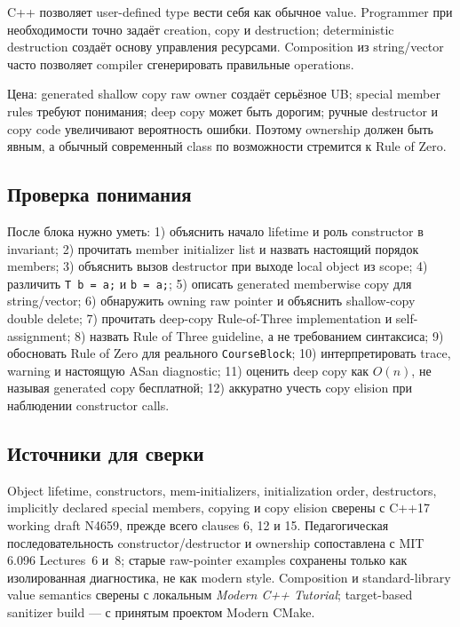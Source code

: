C++ позволяет user-defined type вести себя как обычное value. Programmer при
необходимости точно задаёт creation, copy и destruction; deterministic
destruction создаёт основу управления ресурсами. Composition из string/vector
часто позволяет compiler сгенерировать правильные operations.

Цена: generated shallow copy raw owner создаёт серьёзное UB; special member
rules требуют понимания; deep copy может быть дорогим; ручные destructor и
copy code увеличивают вероятность ошибки. Поэтому ownership должен быть
явным, а обычный современный class по возможности стремится к Rule of Zero.

\subsection{Проверка понимания}

После блока нужно уметь:
1) объяснить начало lifetime и роль constructor в invariant; 2) прочитать member initializer list и назвать настоящий порядок members; 3) объяснить вызов destructor при выходе local object из scope; 4) различить \texttt{T b = a;} и \texttt{b = a;}; 5) описать generated memberwise copy для string/vector; 6) обнаружить owning raw pointer и объяснить shallow-copy double delete; 7) прочитать deep-copy Rule-of-Three implementation и self-assignment; 8) назвать Rule of Three guideline, а не требованием синтаксиса; 9) обосновать Rule of Zero для реального \texttt{CourseBlock}; 10) интерпретировать trace, warning и настоящую ASan diagnostic; 11) оценить deep copy как $O(n)$, не называя generated copy бесплатной; 12) аккуратно учесть copy elision при наблюдении constructor calls.

\subsection{Источники для сверки}

Object lifetime, constructors, mem-initializers, initialization order,
destructors, implicitly declared special members, copying и copy elision
сверены с C++17 working draft N4659, прежде всего clauses 6, 12 и 15.
Педагогическая последовательность constructor/destructor и ownership
сопоставлена с MIT 6.096 Lectures~6 и~8; старые raw-pointer examples сохранены
только как изолированная диагностика, не как modern style. Composition и
standard-library value semantics сверены с локальным \textit{Modern C++
Tutorial}; target-based sanitizer build --- с принятым проектом Modern CMake.
